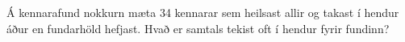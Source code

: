 Á kennarafund nokkurn mæta 34 kennarar sem heilsast allir og takast í hendur áður en fundarhöld hefjast. Hvað er samtals tekist oft í hendur fyrir fundinn?